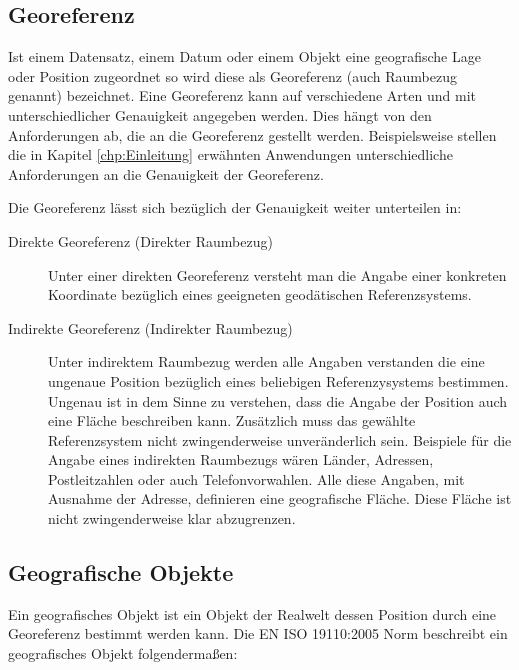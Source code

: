 		\subsection{Georeferenz} 
			
			Ist einem Datensatz, einem Datum oder einem Objekt eine geografische Lage oder Position zugeordnet so wird diese als Georeferenz (auch Raumbezug genannt) bezeichnet.
			Eine Georeferenz kann auf verschiedene Arten und mit unterschiedlicher Genauigkeit angegeben werden.
			Dies hängt von den Anforderungen ab, die an die Georeferenz gestellt werden. 
			Beispielsweise stellen die in Kapitel \ref{chp:Einleitung} erwähnten Anwendungen unterschiedliche Anforderungen an die Genauigkeit der Georeferenz.  
			
			Die Georeferenz lässt sich bezüglich der Genauigkeit weiter unterteilen in: 
		
			\begin{description}

	 			\item[Direkte Georeferenz (Direkter Raumbezug)] 
	 				
	 				Unter einer direkten Georeferenz versteht man die Angabe einer konkreten Koordinate bezüglich eines geeigneten geodätischen Referenzsystems.  

	 			\item[Indirekte Georeferenz (Indirekter Raumbezug)] 
	 				
	 				Unter indirektem Raumbezug werden alle Angaben verstanden die eine ungenaue Position bezüglich eines beliebigen Referenzysystems bestimmen.
		 			Ungenau ist in dem Sinne zu verstehen, dass die Angabe der Position auch eine Fläche beschreiben kann.
		 			Zusätzlich muss das gewählte Referenzsystem nicht zwingenderweise unveränderlich sein.   
		 			Beispiele für die Angabe eines indirekten Raumbezugs wären Länder, Adressen, Postleitzahlen oder auch Telefonvorwahlen. 
		 			Alle diese Angaben, mit Ausnahme der Adresse, definieren eine geografische Fläche. 
		 			Diese Fläche ist nicht zwingenderweise klar abzugrenzen.  

			\end{description}

		\subsection{Geografische Objekte}
			
			Ein geografisches Objekt ist ein Objekt der Realwelt dessen Position durch eine Georeferenz bestimmt werden kann. 
			Die EN ISO 19110:2005 Norm beschreibt ein geografisches Objekt folgendermaßen: 

